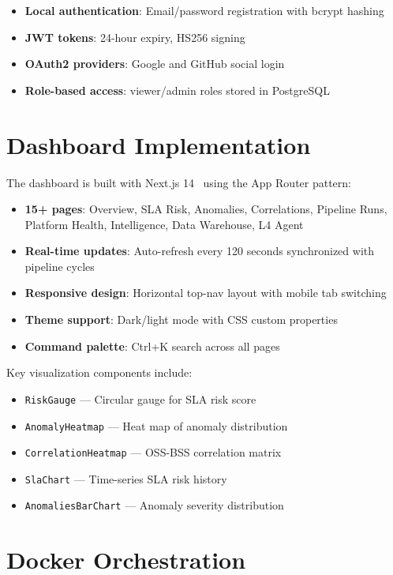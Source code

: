 \begin{itemize}
    \item \textbf{Local authentication}: Email/password registration with bcrypt hashing
    \item \textbf{JWT tokens}: 24-hour expiry, HS256 signing
    \item \textbf{OAuth2 providers}: Google and GitHub social login
    \item \textbf{Role-based access}: viewer/admin roles stored in PostgreSQL
\end{itemize}

\section{Dashboard Implementation}

The dashboard is built with Next.js 14~\cite{nextjs2024} using the App Router pattern:

\begin{itemize}
    \item \textbf{15+ pages}: Overview, SLA Risk, Anomalies, Correlations, Pipeline Runs, Platform Health, Intelligence, Data Warehouse, L4 Agent
    \item \textbf{Real-time updates}: Auto-refresh every 120 seconds synchronized with pipeline cycles
    \item \textbf{Responsive design}: Horizontal top-nav layout with mobile tab switching
    \item \textbf{Theme support}: Dark/light mode with CSS custom properties
    \item \textbf{Command palette}: Ctrl+K search across all pages
\end{itemize}

Key visualization components include:
\begin{itemize}
    \item \texttt{RiskGauge} --- Circular gauge for SLA risk score
    \item \texttt{AnomalyHeatmap} --- Heat map of anomaly distribution
    \item \texttt{CorrelationHeatmap} --- OSS-BSS correlation matrix
    \item \texttt{SlaChart} --- Time-series SLA risk history
    \item \texttt{AnomaliesBarChart} --- Anomaly severity distribution
\end{itemize}

\section{Docker Orchestration}

